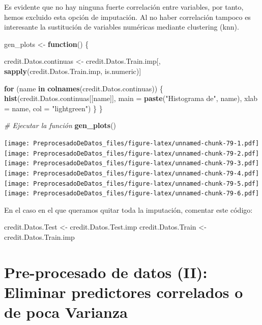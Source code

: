 \documentclass[
]{article}
\newenvironment{Shaded}{\begin{snugshade}}{\end{snugshade}}
\newcommand{\AttributeTok}[1]{\textcolor[rgb]{0.13,0.29,0.53}{#1}}
\newcommand{\CommentTok}[1]{\textcolor[rgb]{0.56,0.35,0.01}{\textit{#1}}}
\newcommand{\ControlFlowTok}[1]{\textcolor[rgb]{0.13,0.29,0.53}{\textbf{#1}}}
\newcommand{\FunctionTok}[1]{\textcolor[rgb]{0.13,0.29,0.53}{\textbf{#1}}}
\newcommand{\NormalTok}[1]{#1}
\newcommand{\OtherTok}[1]{\textcolor[rgb]{0.56,0.35,0.01}{#1}}
\newcommand{\StringTok}[1]{\textcolor[rgb]{0.31,0.60,0.02}{#1}}
\begin{document}
Es evidente que no hay ninguna fuerte correlación entre variables, por
tanto, hemos excluido esta opción de imputación. Al no haber correlación
tampoco es interesante la sustitución de variables numéricas mediante
clustering (knn).

\begin{Shaded}
\begin{Highlighting}[]
\NormalTok{gen\_plots }\OtherTok{\textless{}{-}} \ControlFlowTok{function}\NormalTok{() \{}

\NormalTok{  credit.Datos.continuas }\OtherTok{\textless{}{-}}\NormalTok{ credit.Datos.Train.imp[, }\FunctionTok{sapply}\NormalTok{(credit.Datos.Train.imp, is.numeric)]}
  
  \ControlFlowTok{for}\NormalTok{ (name }\ControlFlowTok{in} \FunctionTok{colnames}\NormalTok{(credit.Datos.continuas)) \{}
    \FunctionTok{hist}\NormalTok{(credit.Datos.continuas[[name]], }
         \AttributeTok{main =} \FunctionTok{paste}\NormalTok{(}\StringTok{"Histograma de"}\NormalTok{, name),}
         \AttributeTok{xlab =}\NormalTok{ name,}
         \AttributeTok{col =} \StringTok{"lightgreen"}\NormalTok{)}
\NormalTok{  \}}
\NormalTok{\}}

\CommentTok{\# Ejecutar la función}
\FunctionTok{gen\_plots}\NormalTok{()}
\end{Highlighting}
\end{Shaded}

\texttt{[image: PreprocesadoDeDatos\_files/figure-latex/unnamed-chunk-79-1.pdf]}
\texttt{[image: PreprocesadoDeDatos\_files/figure-latex/unnamed-chunk-79-2.pdf]}
\texttt{[image: PreprocesadoDeDatos\_files/figure-latex/unnamed-chunk-79-3.pdf]}
\texttt{[image: PreprocesadoDeDatos\_files/figure-latex/unnamed-chunk-79-4.pdf]}
\texttt{[image: PreprocesadoDeDatos\_files/figure-latex/unnamed-chunk-79-5.pdf]}
\texttt{[image: PreprocesadoDeDatos\_files/figure-latex/unnamed-chunk-79-6.pdf]}

En el caso en el que queramos quitar toda la imputación, comentar este
código:

\begin{Shaded}
\begin{Highlighting}[]
\NormalTok{credit.Datos.Test }\OtherTok{\textless{}{-}}\NormalTok{ credit.Datos.Test.imp}
\NormalTok{credit.Datos.Train }\OtherTok{\textless{}{-}}\NormalTok{ credit.Datos.Train.imp}
\end{Highlighting}
\end{Shaded}

\hypertarget{pre-procesado-de-datos-ii-eliminar-predictores-correlados-o-de-poca-varianza}{%
\section{Pre-procesado de datos (II): Eliminar predictores correlados o
de poca
Varianza}\label{pre-procesado-de-datos-ii-eliminar-predictores-correlados-o-de-poca-varianza}}
\end{document}

